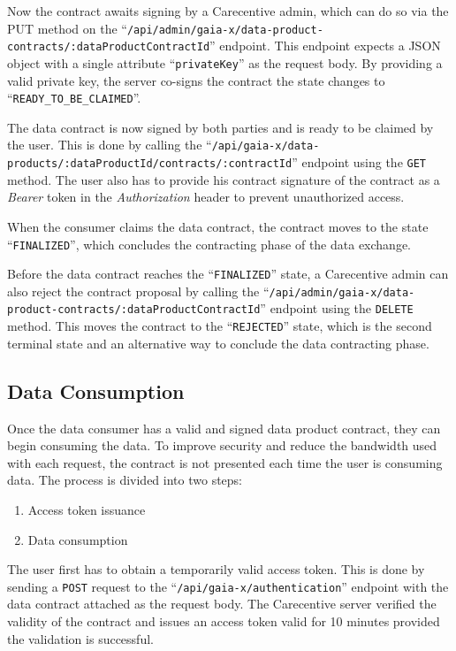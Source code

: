 Now the contract awaits signing by a Carecentive admin, which can do so via the PUT method on the ``\texttt{/api/admin/gaia-x/data-product-contracts/:dataProductContractId}'' endpoint.
This endpoint expects a JSON object with a single attribute ``\texttt{privateKey}'' as the request body.
By providing a valid private key, the server co-signs the contract the state changes to ``\texttt{READY\_TO\_BE\_CLAIMED}''.

The data contract is now signed by both parties and is ready to be claimed by the user.
This is done by calling the ``\texttt{/api/gaia-x/data-products/:dataProductId/contracts/:contractId}'' endpoint using the \texttt{GET} method.
The user also has to provide his contract signature of the contract as a \textit{Bearer} token in the \textit{Authorization} header to prevent unauthorized access.

When the consumer claims the data contract, the contract moves to the state ``\texttt{FINALIZED}'', which concludes the contracting phase of the data exchange.

Before the data contract reaches the ``\texttt{FINALIZED}'' state, a Carecentive admin can also reject the contract proposal by calling the ``\texttt{/api/admin/gaia-x/data-product-contracts/:dataProductContractId}'' endpoint using the \texttt{DELETE} method.
This moves the contract to the ``\texttt{REJECTED}'' state, which is the second terminal state and an alternative way to conclude the data contracting phase.

\subsection{Data Consumption}\label{subsec:data-consumption}

Once the data consumer has a valid and signed data product contract, they can begin consuming the data.
To improve security and reduce the bandwidth used with each request, the contract is not presented each time the user is consuming data.
The process is divided into two steps:
\begin{enumerate}
    \item Access token issuance
    \item Data consumption
\end{enumerate}

The user first has to obtain a temporarily valid access token.
This is done by sending a \texttt{POST} request to the ``\texttt{/api/gaia-x/authentication}'' endpoint with the data contract attached as the request body.
The Carecentive server verified the validity of the contract and issues an access token valid for 10 minutes provided the validation is successful.

